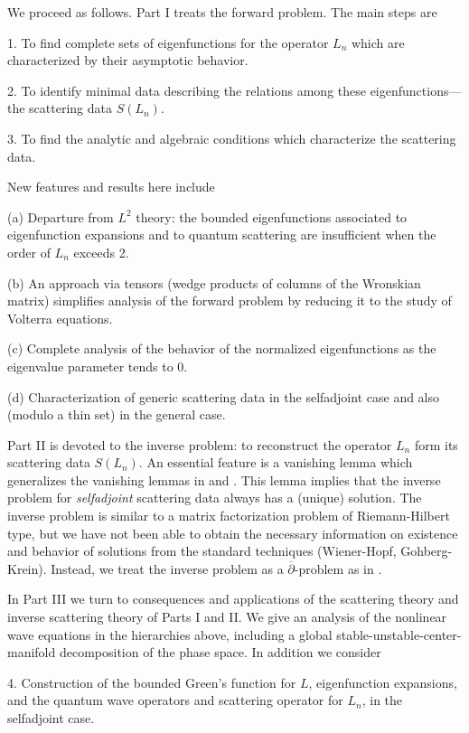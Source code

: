 \documentclass{surv-l}
\theoremstyle{plain}
\theoremstyle{definition}
\numberwithin{equation}{chapter}
\begin{document}
We proceed as follows. Part I treats the forward problem. The main steps are

1. To find complete sets of eigenfunctions for the operator $L_{n}$ which are characterized by their asymptotic behavior.

2. To identify minimal data describing the relations among these eigenfunctions---the scattering data $S(L_{n})$.

3. To find the analytic and algebraic conditions which characterize the scattering data.

New features and results here include

(a) Departure from $L^{2}$ theory: the bounded eigenfunctions associated to eigenfunction expansions and to quantum scattering are insufficient when the order of $L_{n}$ exceeds 2.

(b) An approach via tensors (wedge products of columns of the Wronskian matrix) simplifies analysis of the forward problem by reducing it to the study of Volterra equations.

(c) Complete analysis of the behavior of the normalized eigenfunctions as the eigenvalue parameter tends to $0$.

(d) Characterization of generic scattering data in the selfadjoint case and also (modulo a thin set) in the general case.

Part II is devoted to the inverse problem: to reconstruct the operator $L_{n}$ form its scattering data $S(L_{n})$. An essential feature is a vanishing lemma which generalizes the vanishing lemmas in \cite{DT} and \cite{DTT}. This lemma implies that the inverse problem for \emph{selfadjoint} scattering data always has a (unique) solution. The inverse problem is similar to a matrix factorization problem of Riemann-Hilbert type, but we have not been able to obtain the necessary information on existence and behavior of solutions from the standard techniques (Wiener-Hopf, Gohberg-Krein). Instead, we treat the inverse problem as a $\overline{\partial}$-problem as in \cite{Be, BC1}.

In Part III we turn to consequences and applications of the scattering theory and inverse scattering theory of Parts I and II. We give an analysis of the nonlinear wave equations in the hierarchies above, including a global stable-unstable-center-manifold decomposition of the phase space. In addition we consider

4. Construction of the bounded Green's function for $L$, eigenfunction expansions, and the quantum wave operators and scattering operator for $L_{n}$, in the selfadjoint case.
\end{document}
